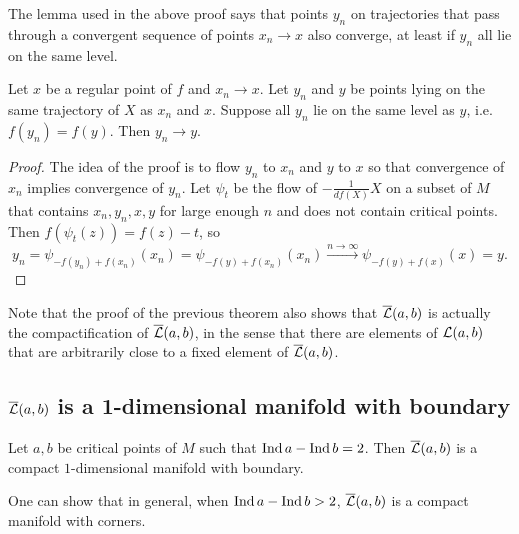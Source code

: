 The lemma used in the above proof says that points $y_n$ on trajectories that pass through a convergent sequence of points $x_n \to x$ also converge, at least if $y_n$ all lie on the same level.
\begin{marginfigure}
    \centering
    \caption{TODO lemma partial squared zero proof}
    \label{fig:lemma-partial-squared-zero-proof}
\end{marginfigure}
\begin{lemma}
    Let $x$ be a regular point of $f$ and $x_n \to x$.
    Let $y_n$ and  $y$ be points lying on the same trajectory of $X$ as  $x_n$ and  $x$.
    Suppose all $y_n$ lie on the same level as  $y$, i.e.  $f(y_n) = f(y)$.
    Then  $y_n \to  y$.
    \label{lemma:level-sets}
\end{lemma}
\begin{proof}
    The idea of the proof is to flow $y_n$ to  $x_n$ and $y$ to $x$ so that convergence of $x_n$ implies convergence of $y_n$.
    Let  $\psi_t$ be the flow of  $-\frac{1}{df (X)} X$ on a subset of $M$ that contains $x_n, y_n, x, y$ for large enough  $n$ and does not contain critical points.
    Then $f(\psi_t(z)) = f(z) - t$, so
     \[
         y_n = \psi_{-f(y_n) + f(x_n)}(x_n) = \psi_{-f(y) + f(x_n)}(x_n) \xrightarrow{n \to \infty}   \psi_{-f(y) + f(x)}(x) = y
    .\] 
\end{proof}

Note that the proof of the previous theorem also shows that $\overline{\mathcal L}(a, b) $ is actually the compactification of  $\overline{\mathcal L}(a, b)$, in the sense that there are elements of  $\mathcal L(a, b)$ that are arbitrarily close to a fixed element of $\overline{\mathcal L}(a, b)$.

\subsection{$\overline{\mathcal L}(a, b)$ is a 1-dimensional manifold with boundary}



\begin{theorem}
    Let $a, b$ be critical points of  $M$ such that  $\operatorname{Ind} a - \operatorname{Ind} b = 2$. Then  $\overline{\mathcal L}(a, b)$ is a compact  $1$-dimensional manifold with boundary.
\end{theorem}

\begin{remark}
    One can show that in general, when $\operatorname{Ind} a - \operatorname{Ind} b > 2$,  $\overline{\mathcal L}(a, b)$ is a compact manifold with corners.
\end{remark}

